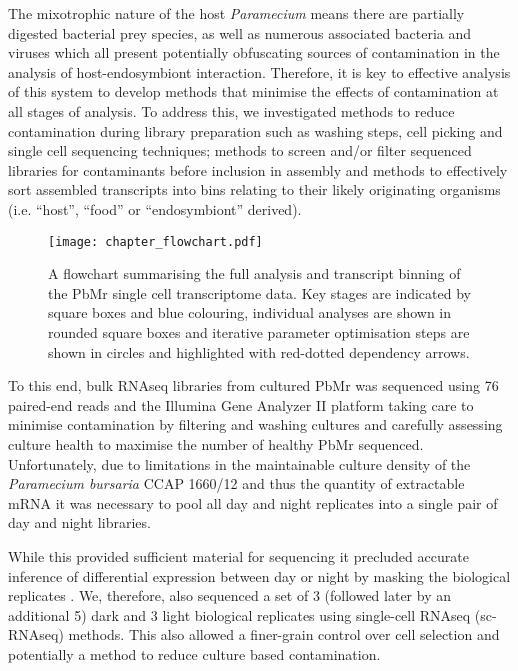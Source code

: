 The mixotrophic nature of the host \textit{Paramecium} \citep{Dolan1992} means there 
are partially digested bacterial prey species, as well as numerous 
associated bacteria \citep{Gortz2009,Fokin2009,Schrallhammer2009} and viruses \citep{VanEtten1983} which
all present potentially obfuscating sources of contamination in the analysis of host-endosymbiont
interaction.  
Therefore, it is key to effective analysis of this system to develop methods
that minimise the effects of contamination at all stages of analysis.  To address this,
we investigated methods to reduce contamination during library preparation such as washing steps, cell picking
and single cell sequencing techniques; methods to screen and/or filter sequenced libraries
for contaminants before inclusion in assembly and methods to effectively sort
assembled transcripts into bins relating to their likely originating organisms
(i.e. ``host'', ``food'' or ``endosymbiont'' derived).


\begin{figure}[h!]
    \texttt{[image: chapter\_flowchart.pdf]}
    \caption[Summary of Single Cell Transcriptome Analysis]{A flowchart summarising the full analysis and transcript binning of the PbMr single cell transcriptome data.  Key stages are indicated by square boxes and blue colouring, individual analyses are shown in rounded square boxes and iterative parameter optimisation steps are shown in circles and highlighted with red-dotted dependency arrows.}
\end{figure}

To this end, bulk RNAseq libraries from cultured PbMr was sequenced using \SI{76}{\bp} paired-end reads and the Illumina Gene Analyzer II platform 
taking care to minimise contamination by filtering and washing cultures and carefully
assessing culture health to maximise the number of healthy PbMr sequenced. 
Unfortunately, due to limitations in the maintainable culture density of the 
\textit{Paramecium bursaria} CCAP 1660/12 and thus the quantity of extractable
mRNA it was necessary to pool all day and night replicates into a single pair of day and night libraries. 

While this provided sufficient material for sequencing it precluded accurate inference of differential expression between day or night
by masking the biological replicates \citep{Auer2010}.
We, therefore, also sequenced a set of 3 (followed later by an additional 5) dark and 3 light
biological replicates using single-cell RNAseq (sc-RNAseq) methods.
This also allowed a finer-grain control over cell selection and potentially
a method to reduce culture based contamination.


